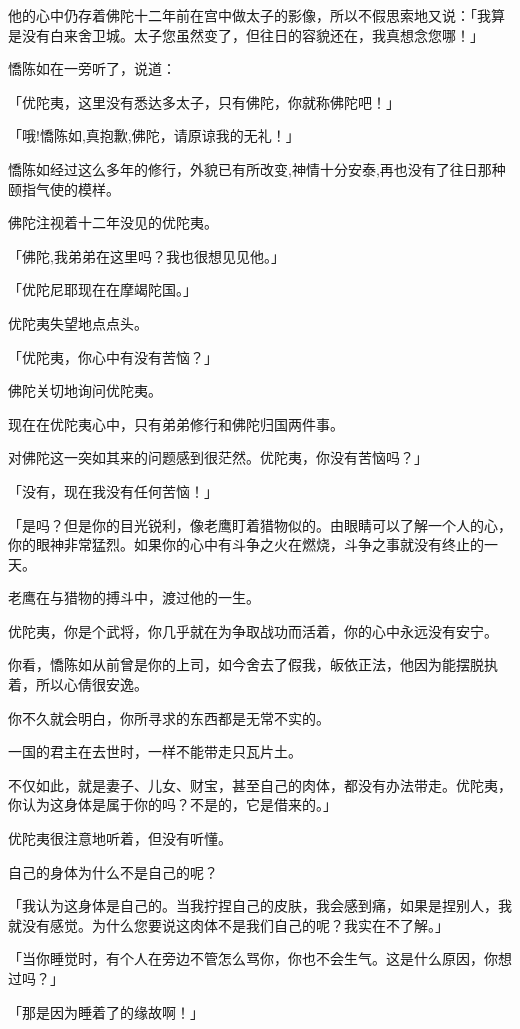 \documentclass[twoside,openany]{book}
\begin{document}
他的心中仍存着佛陀十二年前在宫中做太子的影像，所以不假思索地又说：「我算是没有白来舍卫城。太子您虽然变了，但往日的容貌还在，我真想念您哪！」

憍陈如在一旁听了，说道：

「优陀夷，这里没有悉达多太子，只有佛陀，你就称佛陀吧！」

「哦!憍陈如,真抱歉,佛陀，请原谅我的无礼！」

憍陈如经过这么多年的修行，外貌已有所改变,神情十分安泰,再也没有了往日那种颐指气使的模样。

佛陀注视着十二年没见的优陀夷。

「佛陀,我弟弟在这里吗？我也很想见见他。」

「优陀尼耶现在在摩竭陀国。」

优陀夷失望地点点头。

「优陀夷，你心中有没有苦恼？」

佛陀关切地询问优陀夷。

现在在优陀夷心中，只有弟弟修行和佛陀归国两件事。

对佛陀这一突如其来的问题感到很茫然。优陀夷，你没有苦恼吗？」

「没有，现在我没有任何苦恼！」

「是吗？但是你的目光锐利，像老鹰盯着猎物似的。由眼睛可以了解一个人的心，你的眼神非常猛烈。如果你的心中有斗争之火在燃烧，斗争之事就没有终止的一天。

老鹰在与猎物的搏斗中，渡过他的一生。

优陀夷，你是个武将，你几乎就在为争取战功而活着，你的心中永远没有安宁。

你看，憍陈如从前曾是你的上司，如今舍去了假我，皈依正法，他因为能摆脱执着，所以心倩很安逸。

你不久就会明白，你所寻求的东西都是无常不实的。

一国的君主在去世时，一样不能带走只瓦片土。

不仅如此，就是妻子、儿女、财宝，甚至自己的肉体，都没有办法带走。优陀夷，你认为这身体是属于你的吗？不是的，它是借来的。」

优陀夷很注意地听着，但没有听懂。

自己的身体为什么不是自己的呢？

「我认为这身体是自己的。当我拧捏自己的皮肤，我会感到痛，如果是捏别人，我就没有感觉。为什么您要说这肉体不是我们自己的呢？我实在不了解。」

「当你睡觉时，有个人在旁边不管怎么骂你，你也不会生气。这是什么原因，你想过吗？」

「那是因为睡着了的缘故啊！」
\end{document}
